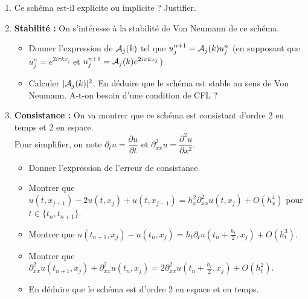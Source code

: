 \documentclass[12pt]{article}
\begin{document}
\begin{exo}
  \begin{enumerate}
  \item Ce sch\'ema est-il explicite ou implicite ? Justifier.
  \item {\bf Stabilit\'e : } On s'int\'eresse \`a la stabilit\'e de Von Neumann de ce sch\'ema.
    \begin{itemize}
    \item Donner l'expression de $\mathcal{A}_j(k)$ tel que $u_j^{n+1} = \mathcal{A}_j(k) u_j^n$
      (en supposant que $u_j^n = e^{2i \pi k x_j}$ et $u_j^{n+1} = \mathcal{A}_j(k) e^{2i \pi k x_j}$)
    \item Calculer $| \mathcal{A}_j(k) |^2$. En d\'eduire que le sch\'ema est stable au sens
      de Von Neumann. A-t-on besoin d'une condition de CFL ?
    \end{itemize}
  \item {\bf Consistance : } On va montrer que ce sch\'ema est consistant d'ordre 2 en temps
    et 2 en espace. \\
    Pour simplifier, on note $\partial_t u = \dfrac{\partial u}{\partial t}$
    et $\partial_{xx}^2 u = \dfrac{\partial^2 u}{\partial x^2}$.
    \begin{itemize}
    \item Donner l'expression de l'erreur de consistance.
    \item Montrer que $u(t,x_{j+1}) - 2 u(t,x_j) + u(t,x_{j-1}) = h_x^2 \partial_{xx}^2 u(t,x_j) + O(h_x^4)$
      pour $t \in \{ t_n , t_{n+1} \}$.
    \item Montrer que $u(t_{n+1},x_j) - u(t_n,x_j) = h_t \partial_t u(t_{n} + \frac{h_t}2 , x_j)
      + O(h_t^3)$.
    \item Montrer que $\partial_{xx}^2 u(t_{n+1},x_j) + \partial_{xx}^2 u(t_{n},x_j)
      = 2 \partial_{xx}^2 u(t_{n} + \frac{h_t}{2},x_j) + O(h_t^2)$.
    \item En d\'eduire que le sch\'ema est d'ordre 2 en espace et en temps.
    \end{itemize}
    
  \end{enumerate}
\end{exo}

\newpage
\end{document}
